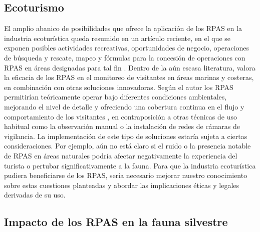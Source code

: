 \documentclass[onecolumn]{extarticle}
\begin{document}
\subsection{Ecoturismo}\label{ecoturismo}

El amplio abanico de posibilidades que ofrece la aplicación de los RPAS
en la industria ecoturística queda resumido en un artículo reciente, en
el que se exponen posibles actividades recreativas, oportunidades de
negocio, operaciones de búsqueda y rescate, mapeo y fórmulas para la
concesión de operaciones con RPAS en áreas designadas para tal fin
\citep{King2014}. Dentro de la aún escasa literatura, \citep{Hansen2016}
valora la eficacia de los RPAS en el monitoreo de visitantes en áreas
marinas y costeras, en combinación con otras soluciones innovadoras.
Según el autor los RPAS permitirían teóricamente operar bajo diferentes
condiciones ambientales, mejorando el nivel de detalle y ofreciendo una
cobertura continua en el flujo y comportamiento de los visitantes , en
contraposición a otras técnicas de uso habitual como la observación
manual o la instalación de redes de cámaras de vigilancia. La
implementación de este tipo de soluciones estaría sujeta a ciertas
consideraciones. Por ejemplo, aún no está claro si el ruido o la
presencia notable de RPAS en áreas naturales podría afectar
negativamente la experiencia del turista o pertubar significativamente a
la fauna. Para que la industria ecoturística pudiera beneficiarse de los
RPAS, sería necesario mejorar nuestro conocimiento sobre estas
cuestiones planteadas y abordar las implicaciones éticas y legales
derivadas de su uso.

\subsection{Impacto de los RPAS en la fauna
silvestre}\label{impacto-de-los-rpas-en-la-fauna-silvestre}
\end{document}
